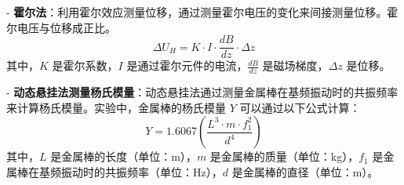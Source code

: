 \documentclass[a4paper,10pt]{article}
\begin{document}
- \textbf{霍尔法}：利用霍尔效应测量位移，通过测量霍尔电压的变化来间接测量位移。霍尔电压与位移成正比。
  \[ \Delta U_H = K \cdot I \cdot \frac{dB}{dz} \cdot \Delta z \]
  其中，\(K\) 是霍尔系数，\(I\) 是通过霍尔元件的电流，\(\frac{dB}{dz}\) 是磁场梯度，\(\Delta z\) 是位移。

- \textbf{动态悬挂法测量杨氏模量}：动态悬挂法通过测量金属棒在基频振动时的共振频率来计算杨氏模量。实验中，金属棒的杨氏模量 $Y$ 可以通过以下公式计算：
\[ Y = 1.6067 \left( \frac{L^3 \cdot m \cdot f_1^2}{d^4} \right) \]
其中，$L$ 是金属棒的长度（单位：m），$m$ 是金属棒的质量（单位：kg），$f_1$ 是金属棒在基频振动时的共振频率（单位：Hz），$d$ 是金属棒的直径（单位：m）。
\end{document}
